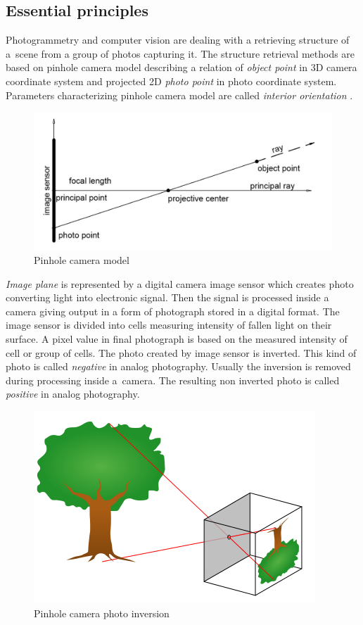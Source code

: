 \documentclass[a4paper,12pt]{article}
\newcommand{\term}[1]{%
{\it #1}%
}
\begin{document}
\subsection{Essential principles}
\label{sec:ess_princip}

Photogrammetry and computer vision are dealing with  a retrieving structure of a~scene from a group of photos 
 capturing it. The structure retrieval methods are based on pinhole camera model 
describing a relation of \term{object point} in 
3D came\-ra coordinate system and projected 2D \term{photo point} in photo coordinate system.
Parameters characterizing pinhole camera model are called \term{interior orientation}.

\begin{figure}[h]
    \centering
    \includegraphics[scale=0.27]{figures/pinhole_camera.png}
    \caption{Pinhole camera model}
\end{figure}


\term{Image plane} is represented by a digital camera image sensor which  creates photo converting light into electronic signal.
Then the signal is processed inside a camera giving output in a form of photograph stored in a digital format. 
The image sensor is divided into cells measuring intensity of fallen light on their surface. A pixel value in final 
photograph is based on the measured intensity of cell or group of cells. The photo created by image sensor is inverted. This kind 
of photo is called \term{negative} in analog photography.  Usually the inversion is removed during processing inside a~camera. The resulting non inverted photo is called \term{positive} in analog photography. 

\begin{figure}[h]
    \centering
    \includegraphics[scale=0.4]{figures/pinhole_camera_inversion.png}
    \caption{Pinhole camera photo inversion \cite{mellish2005pinhole}}
\end{figure}
\end{document}
